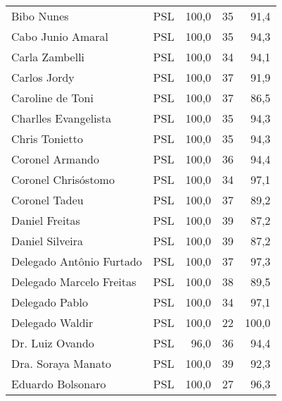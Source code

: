 \begin{longtable}{llrrr}
                          Bibo Nunes &            PSL &     100,0 &           35 &       91,4 \\
                   Cabo Junio Amaral &            PSL &     100,0 &           35 &       94,3 \\
                      Carla Zambelli &            PSL &     100,0 &           34 &       94,1 \\
                        Carlos Jordy &            PSL &     100,0 &           37 &       91,9 \\
                    Caroline de Toni &            PSL &     100,0 &           37 &       86,5 \\
                Charlles Evangelista &            PSL &     100,0 &           35 &       94,3 \\
                      Chris Tonietto &            PSL &     100,0 &           35 &       94,3 \\
                     Coronel Armando &            PSL &     100,0 &           36 &       94,4 \\
                 Coronel Chrisóstomo &            PSL &     100,0 &           34 &       97,1 \\
                       Coronel Tadeu &            PSL &     100,0 &           37 &       89,2 \\
                      Daniel Freitas &            PSL &     100,0 &           39 &       87,2 \\
                     Daniel Silveira &            PSL &     100,0 &           39 &       87,2 \\
            Delegado Antônio Furtado &            PSL &     100,0 &           37 &       97,3 \\
            Delegado Marcelo Freitas &            PSL &     100,0 &           38 &       89,5 \\
                      Delegado Pablo &            PSL &     100,0 &           34 &       97,1 \\
                     Delegado Waldir &            PSL &     100,0 &           22 &      100,0 \\
                     Dr. Luiz Ovando &            PSL &      96,0 &           36 &       94,4 \\
                  Dra. Soraya Manato &            PSL &     100,0 &           39 &       92,3 \\
                   Eduardo Bolsonaro &            PSL &     100,0 &           27 &       96,3 \\

\end{longtable}
